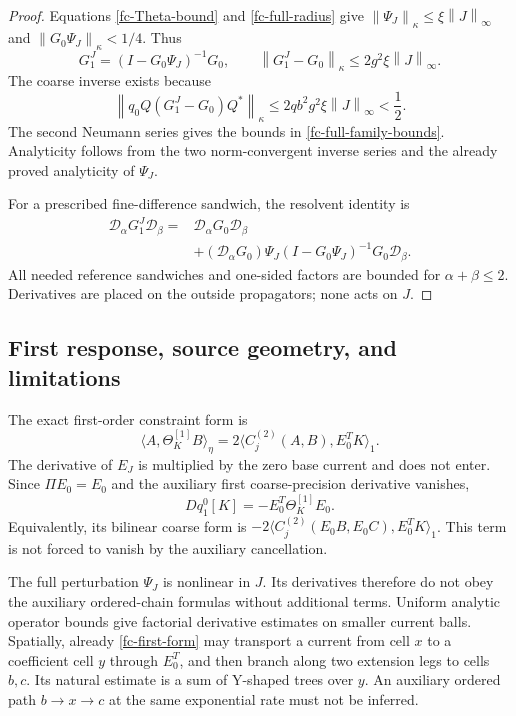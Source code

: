 \documentclass[11pt]{article}
\theoremstyle{remark}\newtheorem{remark}[theorem]{Remark}
\newcommand{\norm}[1]{\left\lVert#1\right\rVert}
\begin{document}
\begin{proof}
Equations \eqref{fc-Theta-bound} and \eqref{fc-full-radius} give
$\norm{\Psi_J}_\kappa\le\xi\norm{J}_\infty$ and
$\norm{G_0\Psi_J}_\kappa<1/4$. Thus
\[
 G_1^J=(I-G_0\Psi_J)^{-1}G_0,
 \qquad
 \norm{G_1^J-G_0}_\kappa\le2g^2\xi\norm{J}_\infty.
\]
The coarse inverse exists because
\[
 \norm{q_0 Q(G_1^J-G_0)Q^*}_\kappa
 \le2qb^2g^2\xi\norm{J}_\infty<\frac12.
\]
The second Neumann series gives the bounds in
\eqref{fc-full-family-bounds}. Analyticity follows from the two
norm-convergent inverse series and the already proved analyticity
of $\Psi_J$.

For a prescribed fine-difference sandwich, the resolvent identity is
\[
 \begin{split}
 \mathcal D_\alpha G_1^J\mathcal D_\beta
 ={}&\mathcal D_\alpha G_0\mathcal D_\beta\\
 &+(\mathcal D_\alpha G_0)\Psi_J
       (I-G_0\Psi_J)^{-1}G_0\mathcal D_\beta.
 \end{split}
\]
All needed reference sandwiches and one-sided factors are bounded
for $\alpha+\beta\le2$. Derivatives are placed on the outside
propagators; none acts on $J$.
\end{proof}

\subsection{First response, source geometry, and limitations}
\label{fc-response-scope}

The exact first-order constraint form is
\begin{equation}
 \langle A,\Theta_K^{[1]}B\rangle_\eta
    =2\langle C_j^{(2)}(A,B),E_0^T K\rangle_1.
 \label{fc-first-form}
\end{equation}
The derivative of $E_J$ is multiplied by the zero base current and
does not enter. Since $\Pi E_0=E_0$ and the auxiliary first
coarse-precision derivative vanishes,
\begin{equation}
 Dq_1^0[K]=-E_0^T\Theta_K^{[1]}E_0.
 \label{fc-first-precision}
\end{equation}
Equivalently, its bilinear coarse form is
$-2\langle C_j^{(2)}(E_0B,E_0C),E_0^TK\rangle_1$.
This term is not forced to vanish by the auxiliary cancellation.

The full perturbation $\Psi_J$ is nonlinear in $J$. Its derivatives
therefore do not obey the auxiliary ordered-chain formulas without
additional terms. Uniform analytic operator bounds give factorial
derivative estimates on smaller current balls. Spatially, already
\eqref{fc-first-form} may transport a current from cell $x$ to a
coefficient cell $y$ through $E_0^T$, and then branch along two
extension legs to cells $b,c$. Its natural estimate is a sum of
Y-shaped trees over $y$. An auxiliary ordered path
$b\to x\to c$ at the same exponential rate must not be inferred.
\end{document}
